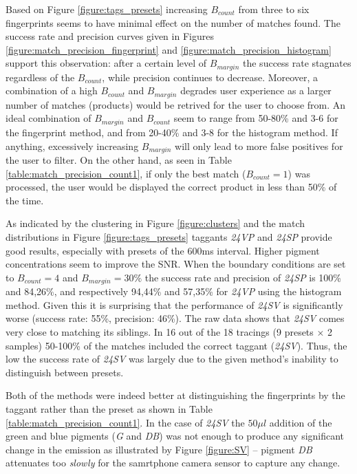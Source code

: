 \documentclass[thesis.tex]{subfiles}
\begin{document}
Based on Figure \ref{figure:tags_presets} increasing $B_{count}$ from three to six fingerprints seems to have minimal effect on the number of matches found. The success rate and precision curves given in Figures \ref{figure:match_precision_fingerprint} and \ref{figure:match_precision_histogram} support this observation: after a certain level of $B_{margin}$ the success rate stagnates regardless of the $B_{count}$, while precision continues to decrease. Moreover, a combination of a high $B_{count}$ and $B_{margin}$ degrades user experience as a larger number of matches (products) would be retrived for the user to choose from. An ideal combination of $B_{margin}$ and $B_{count}$ seem to range from 50-80\% and 3-6 for the fingerprint method, and from 20-40\% and 3-8 for the histogram method. If anything, excessively increasing $B_{margin}$ will only lead to more false positives for the user to filter. On the other hand, as seen in Table \ref{table:match_precision_count1}, if only the best match ($B_{count} = 1$) was processed, the user would be displayed the correct product in less than 50\% of the time.

As indicated by the clustering in Figure \ref{figure:clusters} and the match distributions in Figure \ref{figure:tags_presets} taggants \emph{24VP} and \emph{24SP} provide good results, especially with presets of the 600ms interval. Higher pigment concentrations seem to improve the SNR. When the boundary conditions are set to $B_{count} = 4$ and $B_{margin} = 30\%$ the success rate and precision of \emph{24SP} is 100\% and 84,26\%, and respectively 94,44\% and 57,35\% for \emph{24VP} using the histogram method. Given this it is surprising that the performance of \emph{24SV} is significantly worse (success rate: 55\%, precision: 46\%). The raw data shows that \emph{24SV} comes very close to matching its siblings. In 16 out of the 18 tracings (9 presets $\times$ 2 samples) 50-100\% of the matches included the correct taggant (\emph{24SV}). Thus, the low the success rate of \emph{24SV} was largely due to the given method's inability to distinguish between presets.

Both of the methods were indeed better at distinguishing the fingerprints by the taggant rather than the preset as shown in Table \ref{table:match_precision_count1}. In the case of \emph{24SV} the $50\mu l$ addition of the green and blue pigments (\emph{G} and \emph{DB}) was not enough to produce any significant change in the emission as illustrated by Figure \ref{figure:SV} -- pigment \emph{DB} attenuates too \emph{slowly} for the samrtphone camera sensor to capture any change.
\end{document}
